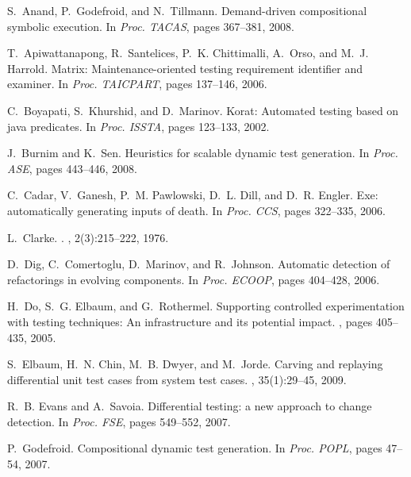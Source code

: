 \documentclass{sig-alternate}
\begin{document}
\begin{thebibliography}{10}
\begin{scriptsize}


S.~Anand, P.~Godefroid, and N.~Tillmann.
\newblock Demand-driven compositional symbolic execution.
\newblock In {\em Proc. TACAS}, pages 367--381, 2008.

T.~Apiwattanapong, R.~Santelices, P.~K. Chittimalli, A.~Orso, and M.~J.
  Harrold.
\newblock Matrix: Maintenance-oriented testing requirement identifier and
  examiner.
\newblock In {\em Proc. TAICPART}, pages 137--146, 2006.

C.~Boyapati, S.~Khurshid, and D.~Marinov.
\newblock Korat: Automated testing based on java predicates.
\newblock In {\em Proc. ISSTA}, pages 123--133, 2002.

J.~Burnim and K.~Sen.
\newblock Heuristics for scalable dynamic test generation.
\newblock In {\em Proc. ASE}, pages 443--446, 2008.

C.~Cadar, V.~Ganesh, P.~M. Pawlowski, D.~L. Dill, and D.~R. Engler.
\newblock Exe: automatically generating inputs of death.
\newblock In {\em Proc. CCS}, pages 322--335, 2006.

L.~Clarke.
.
, 2(3):215--222, 1976.

D.~Dig, C.~Comertoglu, D.~Marinov, and R.~Johnson.
\newblock Automatic detection of refactorings in evolving components.
\newblock In {\em Proc. ECOOP}, pages 404--428, 2006.

H.~Do, S.~G. Elbaum, and G.~Rothermel.
\newblock Supporting controlled experimentation with testing techniques: An
  infrastructure and its potential impact.
, pages 405--435, 2005.

S.~Elbaum, H.~N. Chin, M.~B. Dwyer, and M.~Jorde.
\newblock Carving and replaying differential unit test cases from system test
  cases.
, 35(1):29--45, 2009.

R.~B. Evans and A.~Savoia.
\newblock Differential testing: a new approach to change detection.
\newblock In {\em Proc. FSE}, pages 549--552, 2007.

P.~Godefroid.
\newblock Compositional dynamic test generation.
\newblock In {\em Proc. POPL}, pages 47--54, 2007.


\end{scriptsize}
\end{thebibliography}
\end{document}
